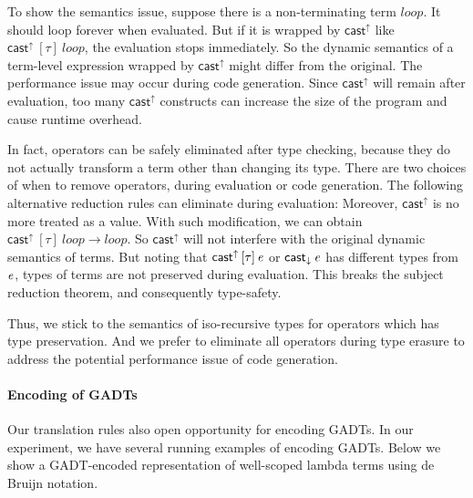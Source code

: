 To show the semantics issue, suppose there is a non-terminating term
$\mathit{loop}$. It should loop forever when evaluated. But if it is
wrapped by $ \mathsf{cast}^{\uparrow} $ like $ \mathsf{cast}^{\uparrow} ~[ \tau ]~\mathit{loop}$, the
evaluation stops immediately. So the dynamic semantics of a term-level
expression wrapped by $ \mathsf{cast}^{\uparrow} $ might differ from the original. The
performance issue may occur during code generation. Since $ \mathsf{cast}^{\uparrow} $
will remain after evaluation, too many $ \mathsf{cast}^{\uparrow} $ constructs can
increase the size of the program and cause runtime overhead.

In fact, \cast operators can be safely eliminated after type checking,
because they do not actually transform a term other than changing its
type. There are two choices of when to remove \cast operators, during
evaluation or code generation. The following alternative reduction
rules can eliminate \cast during evaluation:
\ottusedrule{\ottdruleSXXCastUpE{}}
\ottusedrule{\ottdruleSXXCastDownE{}} Moreover, $ \mathsf{cast}^{\uparrow} $ is no
more treated as a value. With such modification, we can obtain
$ \mathsf{cast}^{\uparrow} ~[ \tau ]~\mathit{loop}  \longrightarrow  \mathit{loop}$. So
$ \mathsf{cast}^{\uparrow} $ will not interfere with the original dynamic semantics of
terms. But noting that $\mathsf{cast}^{\uparrow} \, [  \tau  ] \,  \mathit{e}$ or $\mathsf{cast}_{\downarrow} \, \mathit{e}$ has
different types from $\mathit{e}$, types of terms are not preserved during
evaluation. This breaks the subject reduction theorem, and
consequently type-safety.

Thus, we stick to the semantics of iso-recursive types for \cast
operators which has type preservation. And we prefer to eliminate
all \cast operators during type erasure to address the potential
performance issue of code generation.

\paragraph{Encoding of GADTs}

Our translation rules also open opportunity for encoding GADTs. In our
experiment, we have several running examples of encoding GADTs. Below
we show a GADT-encoded representation of well-scoped lambda terms
using de Bruijn notation.

